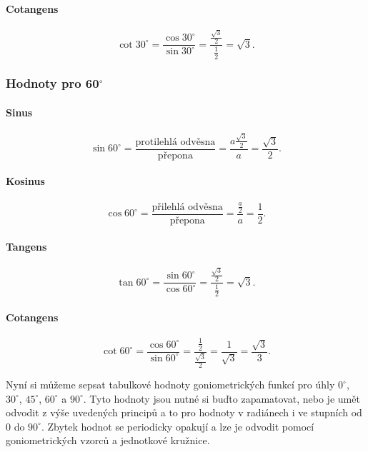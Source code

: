 \documentclass[12pt,a4paper]{article}
\begin{document}
\paragraph{Cotangens}
\[\cot 30^\circ = \frac{\cos 30^\circ}{\sin 30^\circ}
= \frac{\frac{\sqrt{3}}{2}}{\frac{1}{2}} = \sqrt{3}.\]



\subsubsection*{Hodnoty pro $\boldsymbol{60^\circ}$}
\paragraph{Sinus}
\[\sin 60^\circ = \frac{\text{protilehlá odvěsna}}{\text{přepona}}
= \frac{a\frac{\sqrt{3}}{2}}{a} = \frac{\sqrt{3}}{2}.\]

\paragraph{Kosinus}
\[\cos 60^\circ = \frac{\text{přilehlá odvěsna}}{\text{přepona}}
= \frac{\frac{a}{2}}{a} = \frac{1}{2}.\]

\paragraph{Tangens}
\[\tan 60^\circ = \frac{\sin 60^\circ}{\cos 60^\circ}
= \frac{\frac{\sqrt{3}}{2}}{\frac{1}{2}} = \sqrt{3}.\]

\paragraph{Cotangens}
\[\cot 60^\circ = \frac{\cos 60^\circ}{\sin 60^\circ}
= \frac{\frac{1}{2}}{\frac{\sqrt{3}}{2}} = \frac{1}{\sqrt{3}} = \frac{\sqrt{3}}{3}.\]

Nyní si můžeme sepsat tabulkové hodnoty goniometrických funkcí pro úhly
$0^\circ$, $30^\circ$, $45^\circ$, $60^\circ$ a $90^\circ$. Tyto hodnoty jsou nutné si buďto zapamatovat,
nebo je umět odvodit z výše uvedených principů a to pro hodnoty v radiánech i ve stupních od $0$ do $90^\circ$. 
Zbytek hodnot se periodicky opakují a lze je odvodit pomocí goniometrických vzorců a jednotkové kružnice.
\end{document}
